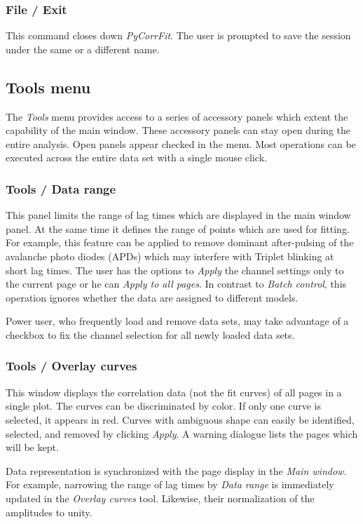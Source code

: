 \subsubsection{File / Exit}
\label{sec:menub.filem.exit}
This command closes down \textit{PyCorrFit}. The user is prompted to save the session under the same or a different name.

\subsection{Tools menu}
\label{sec:menub.tools}
The \textit{Tools} menu provides access to a series of accessory panels which extent the capability of the main window. These accessory panels can stay open during the entire analysis. Open panels appear checked in the menu. Most operations can be executed across the entire data set with a single mouse click. 

\subsubsection{Tools / Data range}
\label{sec:menub.tools.datar}
This panel limits the range of lag times which are displayed in the main window panel. At the same time it defines the range of points which are used for fitting. For example, this feature can be applied to remove dominant after-pulsing of the avalanche photo diodes (APDs) which may interfere with Triplet blinking at short lag times. The user has the options to \textit{Apply} the channel settings only to the current page or he can \textit{Apply to all pages}. In contrast to \textit{Batch control}, this operation ignores whether the data are assigned to different models. 

Power user, who frequently load and remove data sets, may take advantage of a checkbox to fix the channel selection for all newly loaded data sets.

\subsubsection{Tools / Overlay curves}
\label{sec:menub.tools.overl}
This window displays the correlation data (not the fit curves) of all pages in a single plot. The curves can be discriminated by color. If only one curve is selected, it appears in red. Curves with ambiguous shape can easily be identified, selected, and removed by clicking \textit{Apply}. A warning dialogue lists the pages which will be kept.

Data representation is synchronized with the page display in the \textit{Main window}. For example, narrowing the range of lag times by \textit{Data range }is immediately updated in the \textit{Overlay curves }tool. Likewise, their normalization of the amplitudes to unity.

